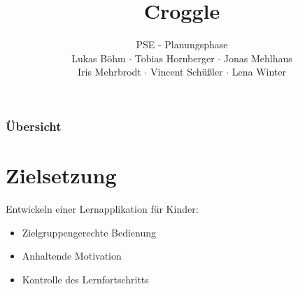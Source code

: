 \documentclass[t]{beamer}
\title{Croggle}
\subtitle{PSE - Planungsphase \\[0.3cm]
Lukas Böhm $\cdot$ Tobias Hornberger $\cdot$ Jonas Mehlhaus \\ Iris Mehrbrodt  $\cdot$ Vincent Schüßler $\cdot$ Lena Winter}
\institute[IPD]{Institut für Programmstruktutren und Datenorganisation}
\begin{document}
\begin{frame}
        \maketitle
\end{frame}

\begin{frame}
        \frametitle{Übersicht}
        \tableofcontents
\end{frame}

\section{Zielsetzung}
\begin{frame}
	Entwickeln einer Lernapplikation für Kinder:\\
	\begin{itemize}
		\item Zielgruppengerechte Bedienung \pause
		\item Anhaltende Motivation \pause
		\item Kontrolle des Lernfortschritts
	\end{itemize}
\end{frame}
\end{document}
